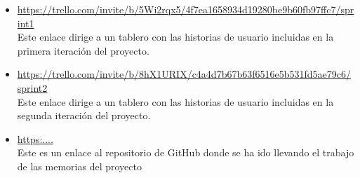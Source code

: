 \documentclass[11pt]{article}
\begin{document}
\begin{itemize}
\item \url{https://trello.com/invite/b/5Wi2rqx5/4f7ea1658934d19280be9b60fb97ffc7/sprint1} \\

Este enlace dirige a un tablero con las historias de usuario incluidas en la primera iteración del proyecto. 

\item \url{https://trello.com/invite/b/8hX1URIX/c4a4d7b67b63f6516e5b531fd5ae79c6/sprint2} \\

Este enlace dirige a un tablero con las historias de usuario incluidas en la segunda iteración del proyecto. 

\item \url{https:....} \\
Este es un enlace al repositorio de GitHub donde se ha ido llevando el trabajo de las memorias del proyecto


\end{itemize}
\end{document}
